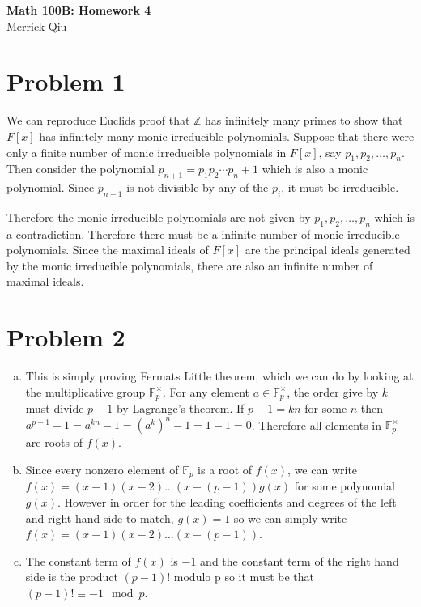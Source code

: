 \documentclass{article}
\begin{document}
\begin{center}
	\huge{\bf Math 100B: Homework 4} \\
	Merrick Qiu
\end{center}

\section*{Problem 1}
We can reproduce Euclids proof that $\mathbb{Z}$ has infinitely many primes to show that 
$F[x]$ has infinitely many monic irreducible polynomials.
Suppose that there were only a finite number of monic irreducible polynomials in $F[x]$, say $p_1, p_2, \ldots, p_n$. 
Then consider the polynomial $p_{n+1} = p_1p_2\cdots p_n + 1$ which is also a monic polynomial.
Since $p_{n+1}$ is not divisible by any of the $p_i$, it must be irreducible.

Therefore the monic irreducible polynomials are not given by $p_1, p_2, \ldots, p_n$ which is a contradiction.
Therefore there must be a infinite number of monic irreducible polynomials.
Since the maximal ideals of $F[x]$ are the principal ideals generated by the monic irreducible polynomials,
there are also an infinite number of maximal ideals.
\newpage 

\section*{Problem 2}
\begin{enumerate}[(a)]
	\item This is simply proving Fermats Little theorem, which we can do by looking at the multiplicative group $\mathbb{F}_p^\times$.
	For any element $a \in \mathbb{F}_p^\times$, the order give by $k$ must divide $p-1$ by Lagrange's theorem.
	If $p-1 = kn$ for some $n$ then $a^{p-1}-1 = a^{kn}-1 = (a^k)^n -1 = 1-1 = 0$.
	Therefore all elements in $\mathbb{F}_p^\times$ are roots of $f(x)$.
	\item Since every nonzero element of $\mathbb{F}_p$ is a root of $f(x)$,
	we can write $f(x) = (x-1)(x-2)\ldots(x-(p-1))g(x)$ for some polynomial $g(x)$.
	However in order for the leading coefficients and degrees of the left and right hand side to match,
	$g(x) = 1$ so we can simply write $f(x) = (x-1)(x-2)\ldots(x-(p-1))$.
	\item The constant term of $f(x)$ is $-1$ and the constant term of the right hand side is 
	the product $(p-1)!$ modulo p so it must be that $(p-1)! \equiv -1 \mod p$. 
\end{enumerate}
\newpage 
\end{document}
